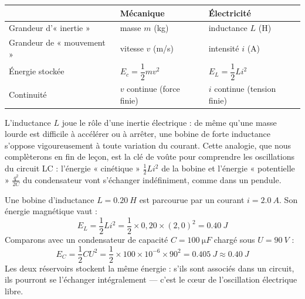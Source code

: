 \documentclass[11pt]{article}
\newcommand{\cle}[1]{{\popxbold\color{popdark}#1}}
\begin{document}
\begin{center}
\begin{tabularx}{\linewidth}{|l|X|X|}
\hline
\rowcolor{popblueL} & \textbf{Mécanique} & \textbf{Électricité} \\
\hline
Grandeur d'« inertie » & masse $m$ (kg) & inductance $L$ (H) \\
\hline
Grandeur de « mouvement » & vitesse $v$ (m/s) & intensité $i$ (A) \\
\hline
Énergie stockée & $E_c = \dfrac{1}{2}mv^2$ & $E_L = \dfrac{1}{2}Li^2$ \\
\hline
Continuité & $v$ continue (force finie) & $i$ continue (tension finie) \\
\hline
\end{tabularx}
\end{center}

L'inductance $L$ joue le rôle d'une \cle{inertie électrique} : de même qu'une masse lourde est difficile à accélérer ou à arrêter, une bobine de forte inductance s'oppose vigoureusement à toute variation du courant. Cette analogie, que nous complèterons en fin de leçon, est la clé de voûte pour comprendre les oscillations du circuit LC : l'énergie « cinétique » $\frac{1}{2}Li^2$ de la bobine et l'énergie « potentielle » $\frac{q^2}{2C}$ du condensateur vont s'échanger indéfiniment, comme dans un pendule.

\begin{exemplebox}
Une bobine d'inductance $L = \SI{0,20}{H}$ est parcourue par un courant $i = \SI{2,0}{A}$. Son énergie magnétique vaut :
\[ E_L = \frac{1}{2}Li^2 = \frac{1}{2}\times 0,20 \times (2,0)^2 = \SI{0,40}{J} \]
Comparons avec un condensateur de capacité $C = \SI{100}{\micro F}$ chargé sous $U = \SI{90}{V}$ :
\[ E_C = \frac{1}{2}CU^2 = \frac{1}{2}\times 100\times 10^{-6}\times 90^2 = \SI{0,405}{J} \approx \SI{0,40}{J} \]
Les deux réservoirs stockent la même énergie : s'ils sont associés dans un circuit, ils pourront se l'échanger intégralement — c'est le cœur de l'oscillation électrique libre.
\end{exemplebox}
\end{document}
